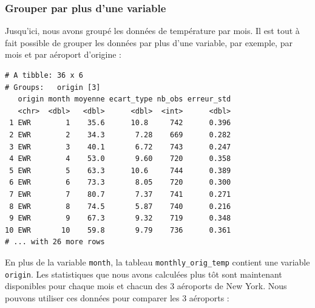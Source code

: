 \documentclass[a4paperpaper,]{article}
\newenvironment{Shaded}{\begin{snugshade}}{\end{snugshade}}
\newcommand{\DataTypeTok}[1]{\textcolor[rgb]{0.00,0.34,0.68}{#1}}
\newcommand{\KeywordTok}[1]{\textcolor[rgb]{0.12,0.11,0.11}{\textbf{#1}}}
\newcommand{\NormalTok}[1]{\textcolor[rgb]{0.12,0.11,0.11}{#1}}
\newcommand{\OperatorTok}[1]{\textcolor[rgb]{0.12,0.11,0.11}{#1}}
\newcommand{\OtherTok}[1]{\textcolor[rgb]{0.00,0.43,0.16}{#1}}
\newcommand{\StringTok}[1]{\textcolor[rgb]{0.75,0.01,0.01}{#1}}
\begin{document}
\hypertarget{grouper-par-plus-dune-variable}{%
\subsubsection{Grouper par plus d'une variable}\label{grouper-par-plus-dune-variable}}

Jusqu'ici, nous avons groupé les données de température par mois. Il est tout à fait possible de grouper les données par plus d'une variable, par exemple, par mois et par aéroport d'origine :

\begin{Shaded}
\end{Shaded}

\begin{verbatim}
# A tibble: 36 x 6
# Groups:   origin [3]
   origin month moyenne ecart_type nb_obs erreur_std
   <chr>  <dbl>   <dbl>      <dbl>  <int>      <dbl>
 1 EWR        1    35.6      10.8     742      0.396
 2 EWR        2    34.3       7.28    669      0.282
 3 EWR        3    40.1       6.72    743      0.247
 4 EWR        4    53.0       9.60    720      0.358
 5 EWR        5    63.3      10.6     744      0.389
 6 EWR        6    73.3       8.05    720      0.300
 7 EWR        7    80.7       7.37    741      0.271
 8 EWR        8    74.5       5.87    740      0.216
 9 EWR        9    67.3       9.32    719      0.348
10 EWR       10    59.8       9.79    736      0.361
# ... with 26 more rows
\end{verbatim}

En plus de la variable \texttt{month}, la tableau \texttt{monthly\_orig\_temp} contient une variable \texttt{origin}. Les statistiques que nous avons calculées plus tôt sont maintenant disponibles pour chaque mois et chacun des 3 aéroports de New York. Nous pouvons utiliser ces données pour comparer les 3 aéroports :
\end{document}
